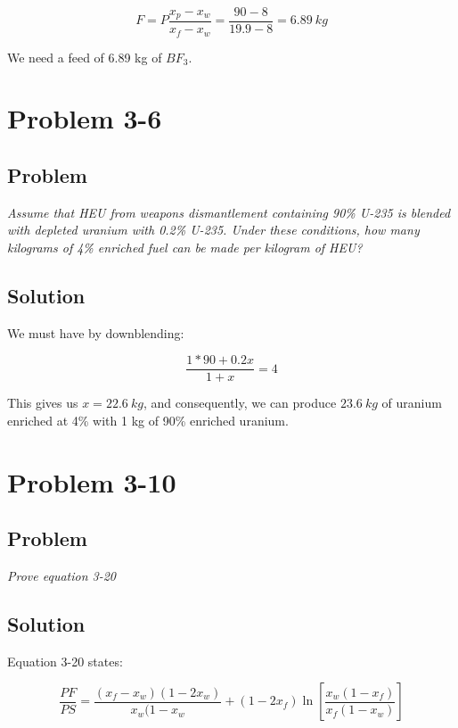 \begin{equation}
F = P\frac{x_p - x_w}{x_f - x_w} = \frac{90 - 8}{19.9 - 8} = 6.89\ kg
\end{equation}

We need a feed of 6.89 kg of $BF_3$.

\section{Problem 3-6}
\label{prob36}

\subsection{Problem}
\textit{Assume that HEU from weapons dismantlement containing 90\% U-235 is blended with depleted uranium with 0.2\% U-235. Under these conditions, how many kilograms of 4\% enriched fuel can be made per kilogram of HEU?}

\subsection{Solution}


We must have by downblending:

\begin{equation}
\frac{1*90 + 0.2x}{1+x} = 4
\end{equation}

This gives us $x = 22.6\ kg$, and consequently, we can produce $23.6\ kg$ of uranium enriched at 4\% with 1 kg of 90\% enriched uranium.


\section{Problem 3-10}
\label{prob310}

\subsection{Problem}
\textit{Prove equation 3-20}

\subsection{Solution}

Equation 3-20 states:

\begin{equation}
\frac{PF}{PS} = \frac{(x_f-x_w)(1-2x_w)}{x_w(1-x_w} + (1-2x_f)\ln \left[ \frac{x_w(1-x_f)}{x_f(1-x_w)} \right]
\end{equation}

